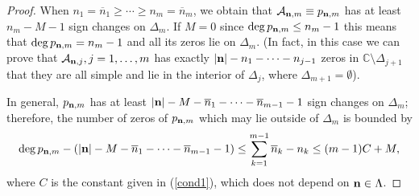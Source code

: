 \documentclass[10pt,a4paper]{article}
\theoremstyle{definition}
\theoremstyle{remark}
\numberwithin{equation}{section}
\begin{document}
\begin{proof}
When $n_1 = \overline{n}_1\geq \cdots \geq n_m = \overline{n}_m$, we obtain that $\mathcal{A}_{{\bf n},m} \equiv p_{{\bf n},m}$ has at least  $n_m -M-1$ sign changes on $\Delta_m$. If $M=0$  since $\deg p_{{\bf n},m} \leq n_m-1$ this means that $\deg p_{{\bf n},m} = n_m-1$ and all its zeros lie on $\Delta_m$. (In fact, in this case we can prove that $\mathcal{A}_{{\bf n},j}, j=1,\ldots,m$ has exactly $|{\bf n}| - n_1-\cdots -n_{j-1}$ zeros in $\mathbb{C} \setminus \Delta_{j+1}$ that they are all simple and lie in the interior of $\Delta_j$, where $\Delta_{m+1} = \emptyset$).

In general,  $p_{{\bf n},m}$ has at least $|{\bf n}|-M - \overline{n}_1 - \cdots-\overline{n}_{m-1}-1$ sign changes on $\Delta_m$; therefore, the number of zeros of $p_{{\bf n},m}$ which may lie outside of $\Delta_m$ is bounded by
\[ \deg p_{{\bf n},m} - (|{\bf n}|-M - \overline{n}_1 - \cdots-\overline{n}_{m-1}-1) \leq \sum_{k=1}^{m-1} \overline{n}_k -n_k \leq (m-1)C+M,\]
where $C$ is the constant given in (\ref{cond1}), which does not depend on ${\bf n} \in \Lambda$.




\end{proof}
\end{document}
